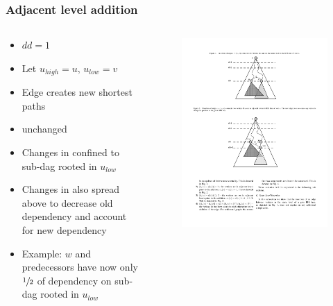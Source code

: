 \begin{frame}
  \frametitle{Adjacent level addition}
  \begin{columns}[onlytextwidth]
  
    \begin{column}{0.5\textwidth}
      \begin{itemize}
        \item $dd = 1$
        \item Let $u_{high} = u ,\, u_{low} = v$
        \item Edge creates new shortest paths
        \item \spdag unchanged
        \item Changes in \paths confined to sub-dag rooted in $u_{low}$
        \item Changes in \dep also spread above to decrease old dependency and account for new dependency
        \item Example: $w$ and predecessors have now only $\sfrac{1}{2}$ of dependency on sub-dag rooted in $u_{low}$
      \end{itemize}
    \end{column}
    
    \begin{column}{0.5\textwidth}
      \begin{figure}[t]
        \centering
        \includegraphics[width=\textwidth, height=\textheight, keepaspectratio]{imgs/green-1lvl-compressed}
      \end{figure}
    \end{column}
  \end{columns}
    
\end{frame}


